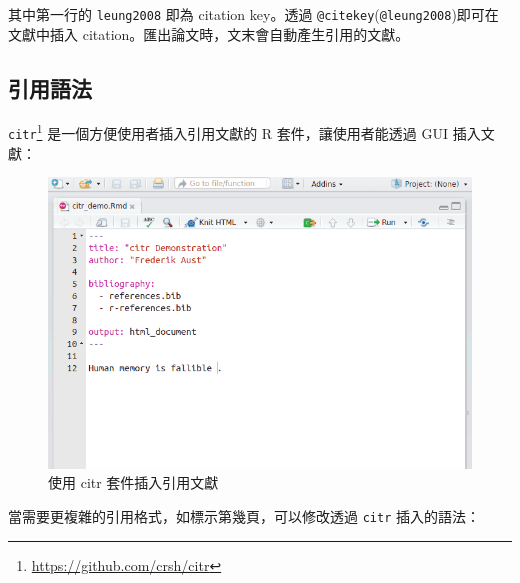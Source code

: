 \documentclass[oneside]{book}
\renewcommand{\href}[2]{#2\footnote{\url{#1}}}
\theoremstyle{definition}
\theoremstyle{definition}
\theoremstyle{definition}
\theoremstyle{remark}
\begin{document}
其中第一行的 \texttt{leung2008} 即為 citation key。透過 \texttt{@citekey}(\texttt{@leung2008})即可在文獻中插入 citation。匯出論文時，文末會自動產生引用的文獻。

\hypertarget{cite-syntax}{%
\subsection{引用語法}\label{cite-syntax}}

\href{https://github.com/crsh/citr}{\texttt{citr}} 是一個方便使用者插入引用文獻的 R 套件，讓使用者能透過 GUI 插入文獻：

\begin{figure}

{\centering \includegraphics[width=1\linewidth]{figs/citr} 

}

\caption{使用 citr 套件插入引用文獻}\label{fig:unnamed-chunk-4}
\end{figure}

當需要更複雜的引用格式，如標示第幾頁，可以修改透過 \texttt{citr} 插入的語法：
\end{document}
